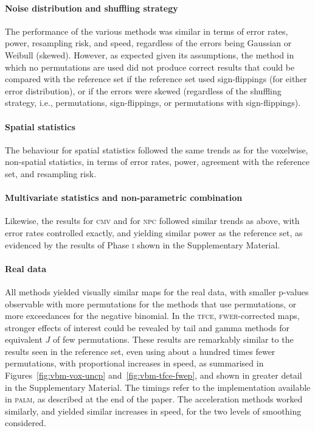 \paragraph{Noise distribution and shuffling strategy} The performance of the various methods was similar in terms of error rates, power, resampling risk, and speed, regardless of the errors being Gaussian or Weibull (skewed). However, as expected given its assumptions, the method in which no permutations are used did not produce correct results that could be compared with the reference set if the reference set used sign-flippings (for either error distribution), or if the errors were skewed (regardless of the shuffling strategy, i.e., permutations, sign-flippings, or permutations with sign-flippings).

\paragraph{Spatial statistics} The behaviour for spatial statistics followed the same trends as for the voxelwise, non-spatial statistics, in terms of error rates, power, agreement with the reference set, and resampling risk.

\paragraph{Multivariate statistics and non-parametric combination} Likewise, the results for \textsc{cmv} and for \textsc{npc} followed similar trends as above, with error rates controlled exactly, and yielding similar power as the reference set, as evidenced by the results of Phase \textsc{i} shown in the Supplementary Material.

\paragraph{Real data} All methods yielded visually similar maps for the real data, with smaller p-values observable with more permutations for the methods that use permutations, or more exceedances for the negative binomial. In the \textsc{tfce}, \textsc{fwer}-corrected maps, stronger effects of interest could be revealed by tail and gamma methods for equivalent $J$ of few permutations. These results are remarkably similar to the results seen in the reference set, even using about a hundred times fewer permutations, with proportional increases in speed, as summarised in Figures~\ref{fig:vbm-vox-uncp} and~\ref{fig:vbm-tfce-fwep}, and shown in greater detail in the Supplementary Material. The timings refer to the implementation available in \textsc{palm}, as described at the end of the paper. The acceleration methods worked similarly, and yielded similar increases in speed, for the two levels of smoothing considered.

